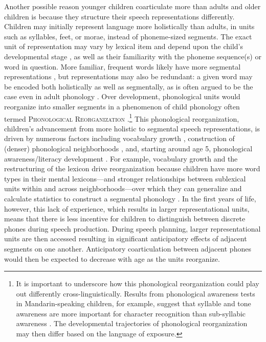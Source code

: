 \documentclass[a4paper,man,natbib,donotrepeattitle, apacite]{apa6}
\begin{document}
Another possible reason younger children coarticulate more than adults and older children is because they structure their speech representations differently. Children may initially represent language more holistically than adults, in units such as syllables, feet, or morae, instead of phoneme-sized segments. The exact unit of representation may vary by lexical item and depend upon the child's developmental stage \cite{davisEmergenceDiscretePerceptualMotor2019}, as well as their familiarity with the phoneme sequence(s) or word in question. More familiar, frequent words likely have more segmental representations \cite{edwardsInteractionVocabularySize2004}, but representations may also be redundant: a given word may be encoded both holistically as well as segmentally, as is often argued to be the case even in adult phonology \cite{pierrehumbertPhoneticDiversityStatistical2003}. Over development, phonological units would reorganize into smaller segments in a phenomenon of child phonology often termed \textsc{Phonological Reorganization}  \cite{goodellAcousticEvidenceDevelopment1992,metsalaYoungChildrenPhonological1999,metsalaYoungChildrenPhonological1999,nittrouerEmergencePhoneticSegments1989,nittrouerHowChildrenLearn1996,noiraySpokenLanguageDevelopment2019,noirayHowChildrenOrganize2018,redfordGrammaticalWordProduction2018,zharkovaCoarticulationIndicatorSpeech2011}.\footnote{It is important to underscore how this phonological reorganization could play out differently cross-linguistically. Results from phonological awareness tests in Mandarin-speaking children, for example, suggest that syllable and tone awareness are more important for character recognition than sub-syllabic awareness \cite{mcbride-changLevelsPhonologicalAwareness2004,shuPhonologicalAwarenessYoung2008a}. The developmental trajectories of phonological reorganization may then differ based on the language of exposure.} This phonological reorganization, children's advancement from more holistic to segmental speech representations, is driven by numerous factors including vocabulary growth \cite{metsalaSpokenVocabularyGrowth1998}, construction of (denser) phonological neighborhoods \cite{storkelInfluencePartwordPhonotactic2011}, and, starting around age 5, phonological awareness/literacy development \cite{metsalaYoungChildrenPhonological1999}. For example, vocabulary growth and the restructuring of the lexicon drive reorganization because children have more word types in their mental lexicons---and stronger relationships between sublexical units within and across neighborhoods---over which they can generalize and calculate statistics to construct a segmental phonology \cite{storkelRestructuringSimilarityNeighbourhoods2002}. In the first years of life, however, this lack of experience, which results in larger representational units, means that there is less incentive for children to distinguish between discrete phones during speech production. During speech planning, larger representational units are then accessed resulting in significant anticipatory effects of adjacent segments on one another. Anticipatory coarticulation between adjacent phones would then be expected to decrease with age as the units reorganize.
\end{document}
